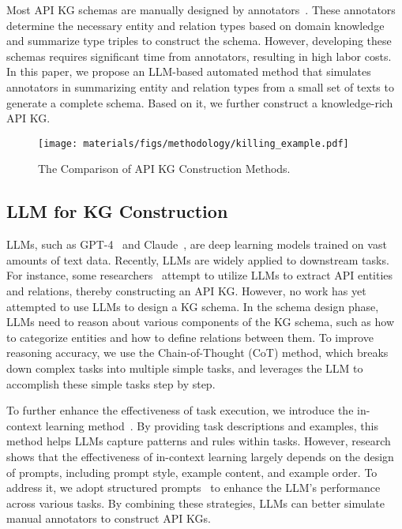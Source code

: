 Most API KG schemas are manually designed by annotators~\cite{huang2022se,Huang2018APIMR,Li2018ImprovingAC}.
These annotators determine the necessary entity and relation types based on domain knowledge and summarize type triples to construct the schema.
However, developing these schemas requires significant time from annotators, resulting in high labor costs.
In this paper, we propose an LLM-based automated method that simulates annotators in summarizing entity and relation types from a small set of texts to generate a complete schema.
Based on it, we further construct a knowledge-rich API KG.

\begin{figure*}[t]
    \centering
    \texttt{[image: materials/figs/methodology/killing\_example.pdf]}    
    \caption{The Comparison of API KG Construction Methods.}
    \label{fig: killing_example}
\end{figure*}

\subsection{LLM for KG Construction}
LLMs, such as GPT-4~\cite{GPT4oAnalysis-1} and Claude~\cite{claude-3-5-sonnet}, are deep learning models trained on vast amounts of text data.
Recently, LLMs are widely applied to downstream tasks.
For instance, some researchers~\cite{yanbang1, yanbang2} attempt to utilize LLMs to extract API entities and relations, thereby constructing an API KG.
However, no work has yet attempted to use LLMs to design a KG schema.
In the schema design phase, LLMs need to reason about various components of the KG schema, such as how to categorize entities and how to define relations between them.
To improve reasoning accuracy, we use the Chain-of-Thought (CoT) method, which breaks down complex tasks into multiple simple tasks, and leverages the LLM to accomplish these simple tasks step by step.

To further enhance the effectiveness of task execution, we introduce the in-context learning method~\cite{Brown2020LanguageMA, Min2022RethinkingTR}.
By providing task descriptions and examples, this method helps LLMs capture patterns and rules within tasks.
However, research~\cite{PCR, huang2024se} shows that the effectiveness of in-context learning largely depends on the design of prompts, including prompt style, example content, and example order.
To address it, we adopt structured prompts~\cite{xing2025when} to enhance the LLM's performance across various tasks.
By combining these strategies, LLMs can better simulate manual annotators to construct API KGs.
